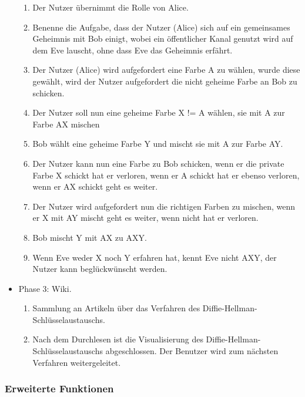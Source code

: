 \documentclass{article}
\begin{document}
\begin{itemize}[label={}]
	\begin{enumerate}
     \item Der Nutzer übernimmt die Rolle von Alice.
     \item Benenne die Aufgabe, dass der Nutzer (Alice) sich auf ein gemeinsames Geheimnis
        mit Bob einigt, wobei ein öffentlicher Kanal genutzt wird auf dem Eve lauscht,
        ohne dass Eve das Geheimnis erfährt.
     \item Der Nutzer (Alice) wird aufgefordert eine Farbe A zu wählen,
        wurde diese gewählt, wird der Nutzer aufgefordert
        die nicht geheime Farbe an Bob zu schicken.
     \item Der Nutzer soll nun eine geheime Farbe X != A wählen,
         sie mit A zur Farbe AX mischen
     \item Bob wählt eine geheime Farbe Y und mischt sie mit A zur Farbe AY.
     \item Der Nutzer kann nun eine Farbe zu Bob schicken,
        wenn er die private Farbe X schickt hat er verloren,
        wenn er A schickt hat er ebenso verloren,
        wenn er AX schickt geht es weiter.
     \item Der Nutzer wird aufgefordert nun die richtigen Farben zu mischen,
        wenn er X mit AY mischt geht es weiter, wenn nicht hat er verloren.
     \item Bob mischt Y mit AX zu AXY.
     \item Wenn Eve weder X noch Y erfahren hat, kennt Eve nicht AXY,
        der Nutzer kann beglückwünscht werden.
	\end{enumerate}

 \item Phase 3: Wiki.

	\begin{enumerate}
	 \item Sammlung an Artikeln über das Verfahren des Diffie-Hellman-Schlüsselaustauschs.
	 \item Nach dem Durchlesen ist die Visualisierung des Diffie-Hellman-Schlüsselaustauschs abgeschlossen. Der Benutzer wird zum nächsten Verfahren weitergeleitet.
 	\end{enumerate}

\end{itemize}

\subsubsection{Erweiterte Funktionen}
\end{document}
